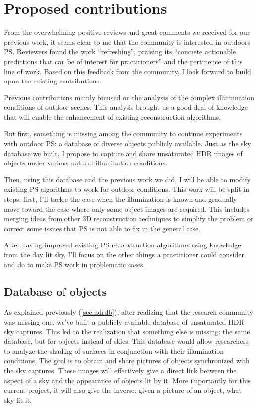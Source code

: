 
\chapter{Proposed contributions}


From the overwhelming positive reviews and great comments we received for our previous work, it seems clear to me that the community is interested in outdoors PS. Reviewers found the work ``refreshing'', praising its ``concrete actionable predictions that can be of interest for practitioners'' and the pertinence of this line of work. Based on this feedback from the community, I look forward to build upon the existing contributions.

Previous contributions mainly focused on the analysis of the complex illumination conditions of outdoor scenes. This analysis brought us a good deal of knowledge that will enable the enhancement of existing reconstruction algorithms.

But first, something is missing among the community to continue experiments with outdoor PS: a database of diverse objects publicly available. Just as the sky database we built, I propose to capture and share unsaturated HDR images of objects under various natural illumination conditions.

Then, using this database and the previous work we did, I will be able to modify existing PS algorithms to work for outdoor conditions. This work will be split in steps: first, I'll tackle the case when the illumination is known and gradually move toward the case where only some object images are required. This includes merging ideas from other 3D reconstruction techniques to simplify the problem or correct some issues that PS is not able to fix in the general case.

After having improved existing PS reconstruction algorithms using knowledge from the day lit sky, I'll focus on the other things a practitioner could consider and do to make PS work in problematic cases.


\section{Database of objects}

As explained previously (\ref{sec:hdrdb}), after realizing that the research community was missing one, we've built a publicly available database of unsaturated HDR sky captures. This led to the realization that something else is missing: the same database, but for objects instead of skies. This database would allow researchers to analyze the shading of surfaces in conjunction with their illumination conditions. The goal is to obtain and share pictures of objects synchronized with the sky captures. These images will effectively give a direct link between the aspect of a sky and the appearance of objects lit by it. More importantly for this current project, it will also give the inverse: given a picture of an object, what sky lit it.

